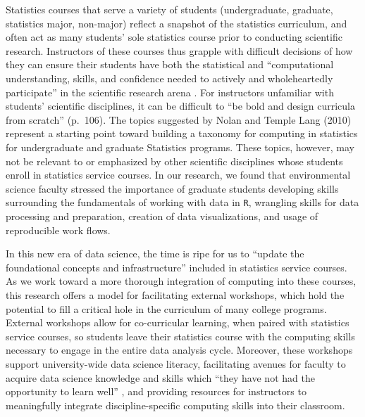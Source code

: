 \documentclass[12pt]{article}
\begin{document}
\quad Statistics courses that serve a variety of students (undergraduate,
graduate, statistics major, non-major) reflect a snapshot of the statistics
curriculum, and often act as many students' sole statistics course prior to
conducting scientific research. Instructors of these courses thus grapple with 
difficult decisions of how they can ensure their students have both the
statistical and ``computational understanding, skills, and confidence needed to
actively and wholeheartedly participate'' in the scientific research arena 
\citep[p.\ 106]{nolan}. For instructors unfamiliar with students' scientific
disciplines, it can be difficult to ``be bold and design curricula from
scratch'' (p.\ 106). The topics suggested by Nolan and Temple Lang
(2010) represent a starting point toward building a taxonomy for computing in
statistics for undergraduate and graduate Statistics programs. These topics,
however, may not be relevant to or emphasized by other scientific disciplines
whose students enroll in statistics service courses.  In our
research, we found that environmental science faculty stressed the importance of
graduate students developing skills surrounding the fundamentals of working with
data in \texttt{R}, wrangling skills for data processing and preparation, 
creation of data visualizations, and usage of reproducible work flows. 

\quad In this new era of data science, the time is ripe for us to ``update the
foundational concepts and infrastructure'' \citep[p.\ 5]{crossroads} included
in statistics service courses. As we work toward a more thorough
integration of computing into these courses, this research offers a model for
facilitating external workshops, which hold the potential to fill a critical
hole in the curriculum of many college programs. External workshops allow for 
co-curricular learning, when paired with statistics service courses, so students
leave their statistics course with the computing skills necessary to engage in
the entire data analysis cycle. Moreover, these workshops support
university-wide data science literacy, facilitating avenues for faculty to
acquire data science knowledge and skills which ``they have not had the
opportunity to learn well'' \citep[p.\ 106]{nolan}, and providing resources for
instructors to meaningfully integrate discipline-specific computing skills into
their classroom. 

\end{document}
